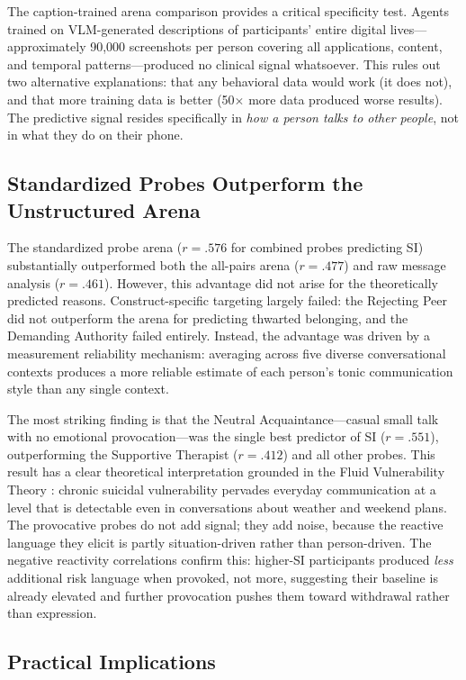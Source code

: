 \documentclass[review,12pt,authoryear]{elsarticle}
\begin{document}
The caption-trained arena comparison provides a critical specificity test. Agents trained on VLM-generated descriptions of participants' entire digital lives---approximately 90,000 screenshots per person covering all applications, content, and temporal patterns---produced no clinical signal whatsoever. This rules out two alternative explanations: that any behavioral data would work (it does not), and that more training data is better (50$\times$ more data produced worse results). The predictive signal resides specifically in \textit{how a person talks to other people}, not in what they do on their phone.

\subsection{Standardized Probes Outperform the Unstructured Arena}

The standardized probe arena ($r = .576$ for combined probes predicting SI) substantially outperformed both the all-pairs arena ($r = .477$) and raw message analysis ($r = .461$). However, this advantage did not arise for the theoretically predicted reasons. Construct-specific targeting largely failed: the Rejecting Peer did not outperform the arena for predicting thwarted belonging, and the Demanding Authority failed entirely. Instead, the advantage was driven by a measurement reliability mechanism: averaging across five diverse conversational contexts produces a more reliable estimate of each person's tonic communication style than any single context.

The most striking finding is that the Neutral Acquaintance---casual small talk with no emotional provocation---was the single best predictor of SI ($r = .551$), outperforming the Supportive Therapist ($r = .412$) and all other probes. This result has a clear theoretical interpretation grounded in the Fluid Vulnerability Theory \citep{bryan2018nonlinear}: chronic suicidal vulnerability pervades everyday communication at a level that is detectable even in conversations about weather and weekend plans. The provocative probes do not add signal; they add noise, because the reactive language they elicit is partly situation-driven rather than person-driven. The negative reactivity correlations confirm this: higher-SI participants produced \textit{less} additional risk language when provoked, not more, suggesting their baseline is already elevated and further provocation pushes them toward withdrawal rather than expression.

\subsection{Practical Implications}
\end{document}
